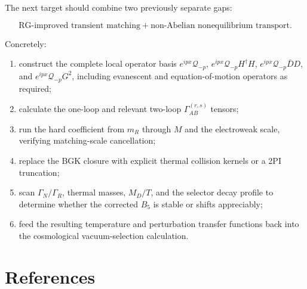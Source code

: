 \documentclass[
  10pt,
]{article}
\providecommand{\tightlist}{%
  \setlength{\itemsep}{0pt}\setlength{\parskip}{0pt}}
\begin{document}
The next target should combine two previously separate gaps:

\[
\boxed{
\text{RG-improved transient matching}
+
\text{non-Abelian nonequilibrium transport}.
}
\]

Concretely:

\begin{enumerate}
\def\labelenumi{\arabic{enumi}.}
\tightlist
\item
  construct the complete local operator basis
  \(e^{ipx}\mathcal Q_{-p}\), \(e^{ipx}\mathcal Q_{-p}H^\dagger H\),
  \(e^{ipx}\mathcal Q_{-p}\bar DD\), and \(e^{ipx}\mathcal Q_{-p}G^2\),
  including evanescent and equation-of-motion operators as required;
\item
  calculate the one-loop and relevant two-loop \(\Gamma_{AB}^{(r,s)}\)
  tensors;
\item
  run the hard coefficient from \(m_R\) through \(M\) and the
  electroweak scale, verifying matching-scale cancellation;
\item
  replace the BGK closure with explicit thermal collision kernels or a
  2PI truncation;
\item
  scan \(\Gamma_N/\Gamma_R\), thermal masses, \(M_D/T\), and the
  selector decay profile to determine whether the corrected \(B_5\) is
  stable or shifts appreciably;
\item
  feed the resulting temperature and perturbation transfer functions
  back into the cosmological vacuum-selection calculation.
\end{enumerate}

\section{References}\label{references}
\end{document}
